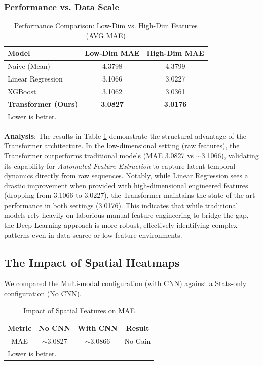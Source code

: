\documentclass[conference]{IEEEtran}
\begin{document}
\subsubsection{Performance vs. Data Scale}
\begin{table}[htbp]
\caption{Performance Comparison: Low-Dim vs. High-Dim Features (AVG MAE)}
\begin{center}
\begin{tabular}{|l|c|c|}
\hline
\textbf{Model} & \textbf{Low-Dim MAE} & \textbf{High-Dim MAE} \\
\hline
Naive (Mean) & 4.3798 & 4.3799 \\
\hline
Linear Regression & 3.1066 & 3.0227 \\
\hline
XGBoost & 3.1062 & 3.0361 \\
\hline
\textbf{Transformer (Ours)} & \textbf{3.0827} & \textbf{3.0176} \\
\hline
\multicolumn{3}{l}{Lower is better.}
\end{tabular}
\label{tab:dim_comparison}
\end{center}
\end{table}
\textbf{Analysis}: The results in Table \ref{tab:dim_comparison} demonstrate the structural advantage of the Transformer architecture. In the low-dimensional setting (raw features), the Transformer outperforms traditional models (MAE 3.0827 vs $\sim$3.1066), validating its capability for \textit{Automated Feature Extraction} to capture latent temporal dynamics directly from raw sequences. Notably, while Linear Regression sees a drastic improvement when provided with high-dimensional engineered features (dropping from 3.1066 to 3.0227), the Transformer maintains the state-of-the-art performance in both settings (3.0176). This indicates that while traditional models rely heavily on laborious manual feature engineering to bridge the gap, the Deep Learning approach is more robust, effectively identifying complex patterns even in data-scarce or low-feature environments.

\subsection{The Impact of Spatial Heatmaps}
We compared the Multi-modal configuration (with CNN) against a Stats-only configuration (No CNN).
\begin{table}[htbp]
\caption{Impact of Spatial Features on MAE}
\begin{center}
\begin{tabular}{|c|c|c|c|}
\hline
\textbf{Metric} & \textbf{No CNN} & \textbf{With CNN} & \textbf{Result} \\
\hline
MAE & $\sim$3.0827 & $\sim$3.0866 & No Gain \\
\hline
\multicolumn{4}{l}{Lower is better.}
\end{tabular}
\label{tab1}
\end{center}
\end{table}
\end{document}
